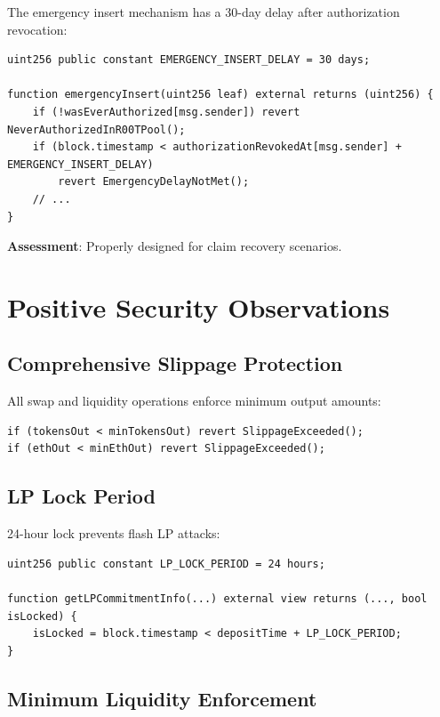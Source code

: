 \documentclass[12pt,a4paper]{article}
\begin{document}
The emergency insert mechanism has a 30-day delay after authorization revocation:

\begin{lstlisting}[language=Solidity]
uint256 public constant EMERGENCY_INSERT_DELAY = 30 days;

function emergencyInsert(uint256 leaf) external returns (uint256) {
    if (!wasEverAuthorized[msg.sender]) revert NeverAuthorizedInR00TPool();
    if (block.timestamp < authorizationRevokedAt[msg.sender] + EMERGENCY_INSERT_DELAY)
        revert EmergencyDelayNotMet();
    // ...
}
\end{lstlisting}

\textbf{Assessment}: Properly designed for claim recovery scenarios.

\section{Positive Security Observations}

\subsection{Comprehensive Slippage Protection}

All swap and liquidity operations enforce minimum output amounts:

\begin{lstlisting}[language=Solidity]
if (tokensOut < minTokensOut) revert SlippageExceeded();
if (ethOut < minEthOut) revert SlippageExceeded();
\end{lstlisting}

\subsection{LP Lock Period}

24-hour lock prevents flash LP attacks:

\begin{lstlisting}[language=Solidity]
uint256 public constant LP_LOCK_PERIOD = 24 hours;

function getLPCommitmentInfo(...) external view returns (..., bool isLocked) {
    isLocked = block.timestamp < depositTime + LP_LOCK_PERIOD;
}
\end{lstlisting}

\subsection{Minimum Liquidity Enforcement}
\end{document}
